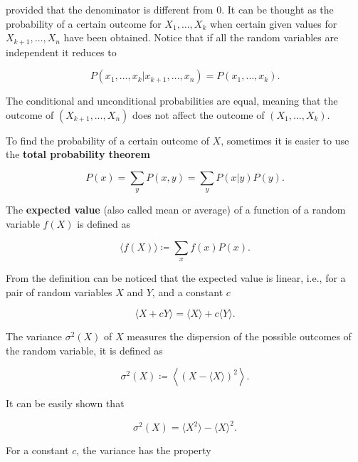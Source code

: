 provided that the denominator is different from $0$. It can be thought as the probability of a certain outcome for $X_1,\dotsc,X_k$ when certain given values for $X_{k+1},\dotsc,X_n$ have been obtained. Notice that if all the random variables are independent it reduces to

\begin{equation*}
  P(x_1,\dotsc,x_k|x_{k+1},\dotsc,x_n) = P(x_1,\dotsc,x_k).
\end{equation*}

The conditional and unconditional probabilities are equal, meaning that the outcome of $(X_{k+1},\dotsc,X_n)$ does not affect the outcome of $(X_1,\dotsc,X_k)$.

To find the probability of a certain outcome of $X$, sometimes it is easier to use the \textbf{total probability theorem}

\begin{equation*}
  P(x) = \sum_y P(x,y) = \sum_y P(x|y)P(y).
\end{equation*}

The \textbf{expected value} (also called mean or average) of a function of a random variable $f(X)$ is defined as

\begin{equation}
  \label{eq:con-ave_def}
  \langle f(X)\rangle \coloneqq \sum_xf(x)P(x).
\end{equation}

From the definition can be noticed that the expected value is linear, i.e., for a pair of random variables $X$ and $Y$, and a constant $c$

\begin{equation*}
  \langle X+cY\rangle = \langle X\rangle+c\langle Y\rangle.
\end{equation*}

The variance $\sigma^2(X)$ of $X$ measures the dispersion of the possible outcomes of the random variable, it is defined as

\begin{equation*}
  \sigma^2(X) \coloneqq \left\langle\left( X-\langle X\rangle\right)^2\right\rangle.
\end{equation*}

It can be easily shown that

\begin{equation}
  \label{eq:con-var_nice}
  \sigma^2(X) = \langle X^2\rangle - \langle X\rangle^2.
\end{equation}

For a constant $c$, the variance has the property

